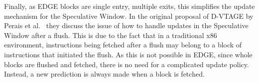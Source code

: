 
Finally, as EDGE blocks are single entry, multiple exits, this simplifies the update mechanism for the Speculative Window.
In the original proposal of D-VTAGE by Perais et al.~\cite{peraisBeBop2015} they discuss the issue of how to handle updates in the Speculative Window after a flush.
This is due to the fact that in a traditional x86 environment, instructions being fetched after a flush may belong to a block of instructions that initiated the flush.
As this is not possible in EDGE, since whole blocks are flushed and fetched, there is no need for a complicated update policy.
Instead, a new prediction is always made when a block is fetched.





